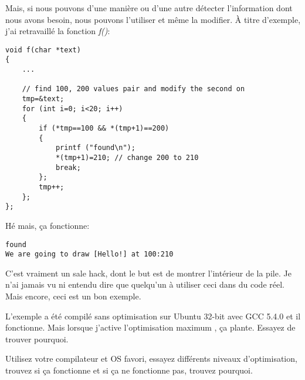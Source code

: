Mais, si nous pouvons d'une manière ou d'une autre détecter l'information dont nous
avons besoin, nous pouvons l'utiliser et même la modifier.
À titre d'exemple, j'ai retravaillé la fonction \emph{f()}:

\begin{lstlisting}[style=customc]
void f(char *text)
{
	...

	// find 100, 200 values pair and modify the second on
	tmp=&text;
	for (int i=0; i<20; i++)
	{
		if (*tmp==100 && *(tmp+1)==200)
		{
			printf ("found\n");
			*(tmp+1)=210; // change 200 to 210
			break;
		};
		tmp++;
	};
};
\end{lstlisting}

Hé mais, ça fonctionne:

\begin{lstlisting}
found
We are going to draw [Hello!] at 100:210
\end{lstlisting}


C'est vraiment un sale hack, dont le but est de montrer l'intérieur de la pile.
Je n'ai jamais vu ni entendu dire que quelqu'un à utiliser ceci dans du code réel.
Mais encore, ceci est un bon exemple.

\myparagraph{\Exercise}

L'exemple a été compilé sans optimisation sur Ubuntu 32-bit avec GCC 5.4.0 et il
fonctionne.
Mais lorsque j'active l'optimisation maximum , ça plante.
Essayez de trouver pourquoi.

Utilisez votre compilateur et OS favori, essayez différents niveaux d'optimisation,
trouvez si ça fonctionne et si ça ne fonctionne pas, trouvez pourquoi.
